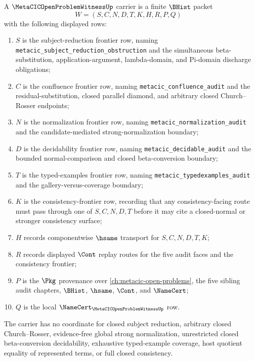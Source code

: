 \begin{definition}
\label{def:metacic-open-problem-witness-carrier}
A $\MetaCICOpenProblemWitnessUp$ carrier is a finite $\BHist$ packet
$$
W=(S,C,N,D,T,K,H,R,P,Q)
$$
with the following displayed rows:
\begin{enumerate}
\item $S$ is the subject-reduction frontier row, naming \texttt{metacic\_subject\_reduction\_obstruction} and the simultaneous beta-substitution, application-argument, lambda-domain, and Pi-domain discharge obligations;
\item $C$ is the confluence frontier row, naming \texttt{metacic\_confluence\_audit} and the residual-substitution, closed parallel diamond, and arbitrary closed Church--Rosser endpoints;
\item $N$ is the normalization frontier row, naming \texttt{metacic\_normalization\_audit} and the candidate-mediated strong-normalization boundary;
\item $D$ is the decidability frontier row, naming \texttt{metacic\_decidable\_audit} and the bounded normal-comparison and closed beta-conversion boundary;
\item $T$ is the typed-examples frontier row, naming \texttt{metacic\_typedexamples\_audit} and the gallery-versus-coverage boundary;
\item $K$ is the consistency-frontier row, recording that any consistency-facing route must pass through one of $S,C,N,D,T$ before it may cite a closed-normal or stronger consistency surface;
\item $H$ records componentwise $\hsame$ transport for $S,C,N,D,T,K$;
\item $R$ records displayed $\Cont$ replay routes for the five audit faces and the consistency frontier;
\item $P$ is the $\Pkg$ provenance over \autoref{ch:metacic-open-problems}, the five sibling audit chapters, $\BHist$, $\hsame$, $\Cont$, and $\NameCert$;
\item $Q$ is the local $\NameCert_{\MetaCICOpenProblemWitnessUp}$ row.
\end{enumerate}
The carrier has no coordinate for closed subject reduction, arbitrary closed Church--Rosser, evidence-free global strong normalization, unrestricted closed beta-conversion decidability, exhaustive typed-example coverage, host quotient equality of represented terms, or full closed consistency.
\end{definition}

